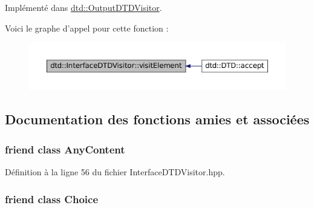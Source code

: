 Implémenté dans \hyperlink{classdtd_1_1_output_d_t_d_visitor_ab95fcc93547eb5e038040f11b0f2b568}{dtd::OutputDTDVisitor}.



Voici le graphe d'appel pour cette fonction :\nopagebreak
\begin{figure}[H]
\begin{center}
\leavevmode
\includegraphics[width=400pt]{classdtd_1_1_interface_d_t_d_visitor_a46b882a06961ea04fd43b2a9d937118b_icgraph}
\end{center}
\end{figure}




\subsection{Documentation des fonctions amies et associées}
\hypertarget{classdtd_1_1_interface_d_t_d_visitor_a98eaefc8d4a0da1a8f9c254c62a68759}{
\subsubsection[{AnyContent}]{\setlength{\rightskip}{0pt plus 5cm}friend class {\bf AnyContent}}}
\label{classdtd_1_1_interface_d_t_d_visitor_a98eaefc8d4a0da1a8f9c254c62a68759}


Définition à la ligne 56 du fichier InterfaceDTDVisitor.hpp.

\hypertarget{classdtd_1_1_interface_d_t_d_visitor_af8084f88f5641132057732496deab026}{
\subsubsection[{Choice}]{\setlength{\rightskip}{0pt plus 5cm}friend class {\bf Choice}}}
\label{classdtd_1_1_interface_d_t_d_visitor_af8084f88f5641132057732496deab026}


